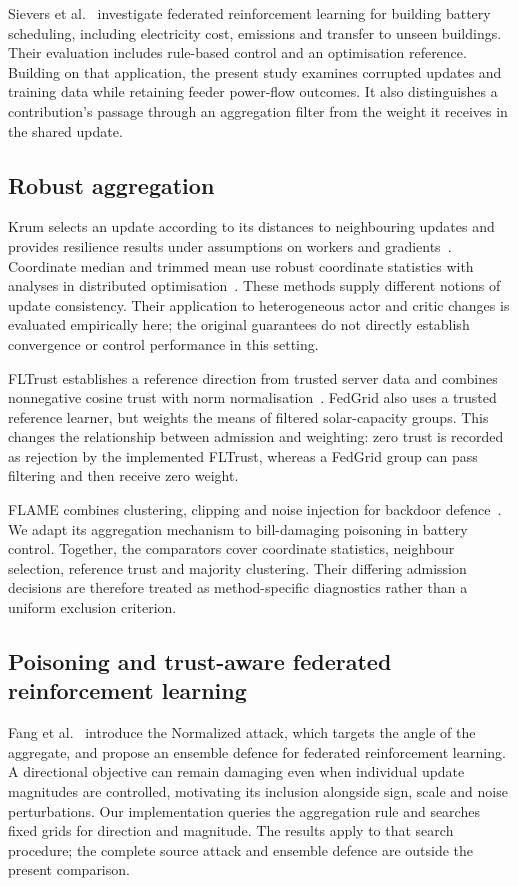 \documentclass[preprint,12pt,a4paper]{elsarticle}
\begin{document}
Sievers et al.~\cite{sievers} investigate federated reinforcement learning for building battery scheduling, including electricity cost, emissions and transfer to unseen buildings. Their evaluation includes rule-based control and an optimisation reference. Building on that application, the present study examines corrupted updates and training data while retaining feeder power-flow outcomes. It also distinguishes a contribution's passage through an aggregation filter from the weight it receives in the shared update.

\subsection{Robust aggregation}
Krum selects an update according to its distances to neighbouring updates and provides resilience results under assumptions on workers and gradients~\cite{krum}. Coordinate median and trimmed mean use robust coordinate statistics with analyses in distributed optimisation~\cite{yin}. These methods supply different notions of update consistency. Their application to heterogeneous actor and critic changes is evaluated empirically here; the original guarantees do not directly establish convergence or control performance in this setting.

FLTrust establishes a reference direction from trusted server data and combines nonnegative cosine trust with norm normalisation~\cite{fltrust}. FedGrid also uses a trusted reference learner, but weights the means of filtered solar-capacity groups. This changes the relationship between admission and weighting: zero trust is recorded as rejection by the implemented FLTrust, whereas a FedGrid group can pass filtering and then receive zero weight.

FLAME combines clustering, clipping and noise injection for backdoor defence~\cite{flame}. We adapt its aggregation mechanism to bill-damaging poisoning in battery control. Together, the comparators cover coordinate statistics, neighbour selection, reference trust and majority clustering. Their differing admission decisions are therefore treated as method-specific diagnostics rather than a uniform exclusion criterion.

\subsection{Poisoning and trust-aware federated reinforcement learning}
Fang et al.~\cite{fang} introduce the Normalized attack, which targets the angle of the aggregate, and propose an ensemble defence for federated reinforcement learning. A directional objective can remain damaging even when individual update magnitudes are controlled, motivating its inclusion alongside sign, scale and noise perturbations. Our implementation queries the aggregation rule and searches fixed grids for direction and magnitude. The results apply to that search procedure; the complete source attack and ensemble defence are outside the present comparison.
\end{document}
